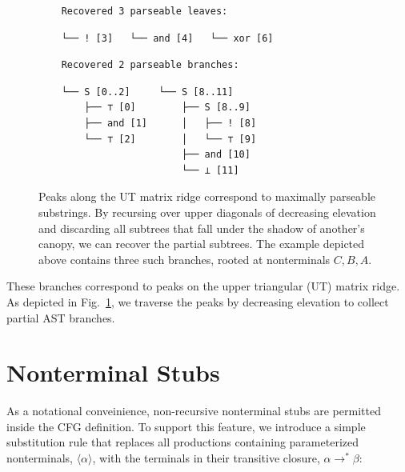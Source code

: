 \documentclass[sigplan,review,anonymous,acmsmall]{acmart}\settopmatter{printfolios=false,printccs=false,printacmref=false}
\begin{document}
\begin{figure}[H]
\begin{minipage}[l]{6cm}
      \begin{verbatim}
    Recovered 3 parseable leaves:
      \end{verbatim}
      \noindent\hspace{0.64cm}\hspace{1.70cm}\hspace{1.98cm}\vspace{-5pt}
      \begin{verbatim}
    └── ! [3]   └── and [4]   └── xor [6]
      \end{verbatim}

      \begin{verbatim}
    Recovered 2 parseable branches:
      \end{verbatim}
    \hspace{0.63cm}\hspace{2.48cm}\vspace{-5pt}
      \begin{verbatim}
    └── S [0..2]     └── S [8..11]
        ├── ⊤ [0]        ├── S [8..9]
        ├── and [1]      │   ├── ! [8]
        └── ⊤ [2]        │   └── ⊤ [9]
                         ├── and [10]
                         └── ⊥ [11]
      \end{verbatim}
    \end{minipage}
  \caption{Peaks along the UT matrix ridge correspond to maximally parseable substrings. By recursing over upper diagonals of decreasing elevation and discarding all subtrees that fall under the shadow of another's canopy, we can recover the partial subtrees. The example depicted above contains three such branches, rooted at nonterminals $C, B, A$.}\label{fig:peaks}
\end{figure}

\noindent These branches correspond to peaks on the upper triangular (UT) matrix ridge. As depicted in Fig.~\ref{fig:peaks}, we traverse the peaks by decreasing elevation to collect partial AST branches.

\pagebreak\section{Nonterminal Stubs}

\noindent As a notational conveinience, non-recursive nonterminal stubs are permitted inside the CFG definition. To support this feature, we introduce a simple substitution rule that replaces all productions containing parameterized nonterminals, $\langle\alpha\rangle$, with the terminals in their transitive closure, $\alpha \rightarrow^* \beta$:
\end{document}
